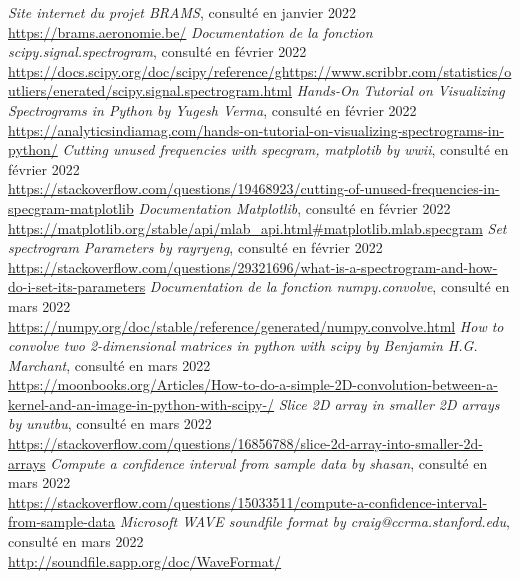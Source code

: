 \documentclass[11pt]{article}
\begin{document}
\begin{thebibliography}{100}
    \textit{Site internet du projet BRAMS}, consulté en janvier 2022\\\url{https://brams.aeronomie.be/}
    \textit{Documentation de la fonction scipy.signal.spectrogram}, consulté en février 2022\\\url{https://docs.scipy.org/doc/scipy/reference/ghttps://www.scribbr.com/statistics/outliers/enerated/scipy.signal.spectrogram.html}
    \textit{Hands-On Tutorial on Visualizing Spectrograms in Python by Yugesh Verma}, consulté en février 2022\\\url{https://analyticsindiamag.com/hands-on-tutorial-on-visualizing-spectrograms-in-python/}
    \textit{Cutting unused frequencies with specgram, matplotib by wwii}, consulté en février 2022\\\url{https://stackoverflow.com/questions/19468923/cutting-of-unused-frequencies-in-specgram-matplotlib}
    \textit{Documentation Matplotlib}, consulté en février 2022\\\url{https://matplotlib.org/stable/api/mlab_api.html#matplotlib.mlab.specgram}
    \textit{Set spectrogram Parameters by rayryeng}, consulté en février 2022\\\url{https://stackoverflow.com/questions/29321696/what-is-a-spectrogram-and-how-do-i-set-its-parameters}
    \textit{Documentation de la fonction numpy.convolve}, consulté en mars 2022\\\url{https://numpy.org/doc/stable/reference/generated/numpy.convolve.html}
    \textit{How to convolve two 2-dimensional matrices in python with scipy by Benjamin H.G. Marchant}, consulté en mars 2022\\\url{https://moonbooks.org/Articles/How-to-do-a-simple-2D-convolution-between-a-kernel-and-an-image-in-python-with-scipy-/}
    \textit{Slice 2D array in smaller 2D arrays by unutbu}, consulté en mars 2022\\\url{https://stackoverflow.com/questions/16856788/slice-2d-array-into-smaller-2d-arrays}
    \textit{Compute a confidence interval from sample data by shasan}, consulté en mars 2022\\\url{https://stackoverflow.com/questions/15033511/compute-a-confidence-interval-from-sample-data}
    \textit{Microsoft WAVE soundfile format by craig@ccrma.stanford.edu}, consulté en mars 2022\\\url{http://soundfile.sapp.org/doc/WaveFormat/}

\end{thebibliography}
\end{document}
